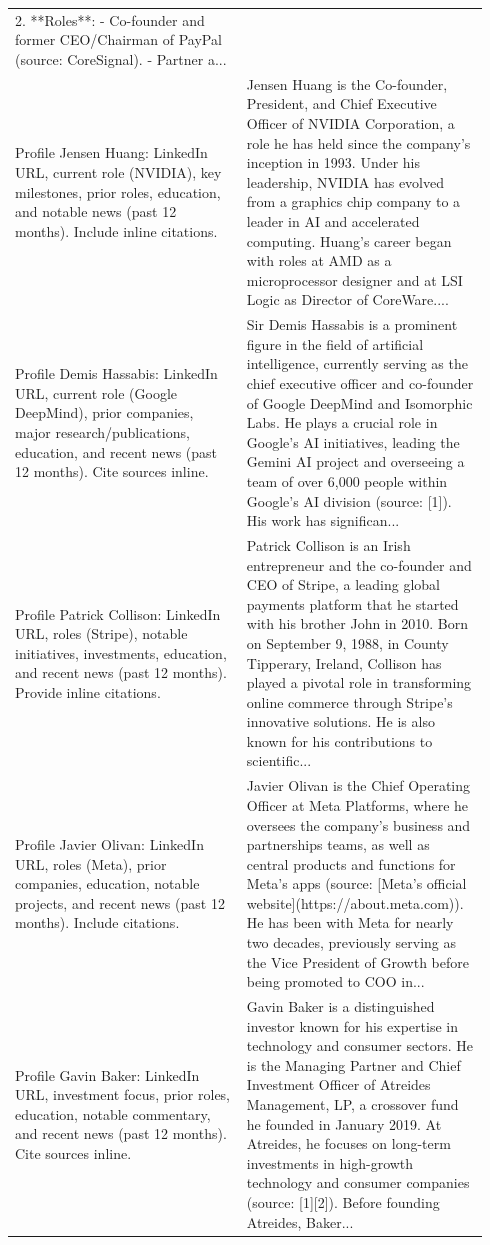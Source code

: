 \begin{longtable}{p{0.46\linewidth} p{0.48\linewidth}}
2. **Roles**:
   - Co-founder and former CEO/Chairman of PayPal (source: CoreSignal).
   - Partner a... \\
\addlinespace
Profile Jensen Huang: LinkedIn URL, current role (NVIDIA), key milestones, prior roles, education, and notable news (past 12 months). Include inline citations. & Jensen Huang is the Co-founder, President, and Chief Executive Officer of NVIDIA Corporation, a role he has held since the company's inception in 1993. Under his leadership, NVIDIA has evolved from a graphics chip company to a leader in AI and accelerated computing. Huang's career began with roles at AMD as a microprocessor designer and at LSI Logic as Director of CoreWare.... \\
\addlinespace
Profile Demis Hassabis: LinkedIn URL, current role (Google DeepMind), prior companies, major research/publications, education, and recent news (past 12 months). Cite sources inline. & Sir Demis Hassabis is a prominent figure in the field of artificial intelligence, currently serving as the chief executive officer and co-founder of Google DeepMind and Isomorphic Labs. He plays a crucial role in Google's AI initiatives, leading the Gemini AI project and overseeing a team of over 6,000 people within Google's AI division (source: [1]). His work has significan... \\
\addlinespace
Profile Patrick Collison: LinkedIn URL, roles (Stripe), notable initiatives, investments, education, and recent news (past 12 months). Provide inline citations. & Patrick Collison is an Irish entrepreneur and the co-founder and CEO of Stripe, a leading global payments platform that he started with his brother John in 2010. Born on September 9, 1988, in County Tipperary, Ireland, Collison has played a pivotal role in transforming online commerce through Stripe's innovative solutions. He is also known for his contributions to scientific... \\
\addlinespace
Profile Javier Olivan: LinkedIn URL, roles (Meta), prior companies, education, notable projects, and recent news (past 12 months). Include citations. & Javier Olivan is the Chief Operating Officer at Meta Platforms, where he oversees the company's business and partnerships teams, as well as central products and functions for Meta's apps (source: [Meta's official website](https://about.meta.com)). He has been with Meta for nearly two decades, previously serving as the Vice President of Growth before being promoted to COO in... \\
\addlinespace
Profile Gavin Baker: LinkedIn URL, investment focus, prior roles, education, notable commentary, and recent news (past 12 months). Cite sources inline. & Gavin Baker is a distinguished investor known for his expertise in technology and consumer sectors. He is the Managing Partner and Chief Investment Officer of Atreides Management, LP, a crossover fund he founded in January 2019. At Atreides, he focuses on long-term investments in high-growth technology and consumer companies (source: [1][2]). Before founding Atreides, Baker... \\

\end{longtable}
